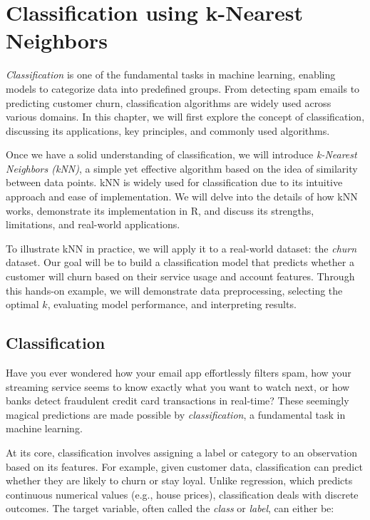 \documentclass[
  11pt,
]{book}
\theoremstyle{definition}
\theoremstyle{definition}
\theoremstyle{definition}
\theoremstyle{definition}
\theoremstyle{remark}
\begin{document}
\chapter{Classification using k-Nearest Neighbors}\label{chapter-knn}

\emph{Classification} is one of the fundamental tasks in machine learning, enabling models to categorize data into predefined groups. From detecting spam emails to predicting customer churn, classification algorithms are widely used across various domains. In this chapter, we will first explore the concept of classification, discussing its applications, key principles, and commonly used algorithms.

Once we have a solid understanding of classification, we will introduce \emph{k-Nearest Neighbors (kNN)}, a simple yet effective algorithm based on the idea of similarity between data points. kNN is widely used for classification due to its intuitive approach and ease of implementation. We will delve into the details of how kNN works, demonstrate its implementation in R, and discuss its strengths, limitations, and real-world applications.

To illustrate kNN in practice, we will apply it to a real-world dataset: the \emph{churn} dataset. Our goal will be to build a classification model that predicts whether a customer will churn based on their service usage and account features. Through this hands-on example, we will demonstrate data preprocessing, selecting the optimal \(k\), evaluating model performance, and interpreting results.

\section{Classification}\label{classification}

Have you ever wondered how your email app effortlessly filters spam, how your streaming service seems to know exactly what you want to watch next, or how banks detect fraudulent credit card transactions in real-time? These seemingly magical predictions are made possible by \emph{classification}, a fundamental task in machine learning.

At its core, classification involves assigning a label or category to an observation based on its features. For example, given customer data, classification can predict whether they are likely to churn or stay loyal. Unlike regression, which predicts continuous numerical values (e.g., house prices), classification deals with discrete outcomes. The target variable, often called the \emph{class} or \emph{label}, can either be:
\end{document}
